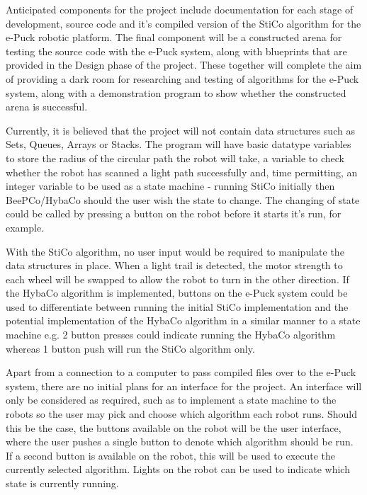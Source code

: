 Anticipated components for the project include documentation for each stage of
development, source code and it's compiled version of the StiCo algorithm for
the e-Puck robotic platform.  The final component will be a constructed arena
for testing the source code with the e-Puck system, along with blueprints that
are provided in the Design phase of the project.  These together will complete
the aim of providing a dark room for researching and testing of algorithms for
the e-Puck system, along with a demonstration program to show whether the 
constructed arena is successful.

Currently, it is believed that the project will not contain data structures
such as Sets, Queues, Arrays or Stacks.  The program will have basic datatype
variables to store the radius of the circular path the robot will take, a 
variable to check whether the robot has scanned a light path successfully and,
time permitting, an integer variable to be used as a state machine - running
StiCo initially then BeePCo/HybaCo should the user wish the state to change.
The changing of state could be called by pressing a button on the robot before
it starts it's run, for example.

With the StiCo algorithm, no user input would be required to manipulate the
data structures in place.  When a light trail is detected, the motor strength
to each wheel will be swapped to allow the robot to turn in the other 
direction.  If the HybaCo algorithm is implemented, buttons on the e-Puck 
system could be used to differentiate between running the initial StiCo
implementation and the potential implementation of the HybaCo algorithm in a
similar manner to a state machine e.g. 2 button presses could indicate running
the HybaCo algorithm whereas 1 button push will run the StiCo algorithm only.

Apart from a connection to a computer to pass compiled files over to the e-Puck
system, there are no initial plans for an interface for the project.  An 
interface will only be considered as required, such as to implement a state
machine to the robots so the user may pick and choose which algorithm each
robot runs.  Should this be the case, the buttons available on the robot will 
be the user interface, where the user pushes a single button to denote which
algorithm should be run.  If a second button is available on the robot, this
will be used to execute the currently selected algorithm.  Lights on the robot
can be used to indicate which state is currently running.

